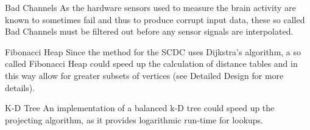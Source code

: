 \begin{aims}
	\item[\hspace*{11mm}Bad Channels] 
As the hardware sensors used to measure the brain activity are known to sometimes fail and thus to produce corrupt input data, these so called Bad Channels must be filtered out before any sensor signals are interpolated.
\end{aims}

\begin{aims}
	\item[\hspace*{11mm}Fibonacci Heap] 
Since the method for the SCDC uses Dijkstra's algorithm, a so called Fibonacci Heap could speed up the calculation of distance tables and in this way allow for greater subsets of vertices (see Detailed Design for more details).
\end{aims}

\begin{aims}
	\item[\hspace*{11mm}K-D Tree] 
An implementation of a balanced k-D tree could speed up the projecting algorithm, as it provides logarithmic run-time for lookups.
\end{aims}